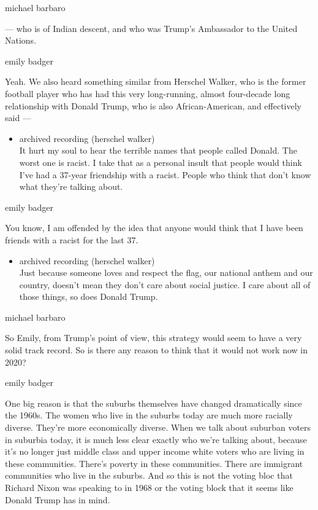 michael barbaro

--- who is of Indian descent, and who was Trump's Ambassador to the
United Nations.

emily badger

Yeah. We also heard something similar from Herschel Walker, who is the
former football player who has had this very long-running, almost
four-decade long relationship with Donald Trump, who is also
African-American, and effectively said ---

\begin{itemize}
\tightlist
\item
  archived recording (herschel walker)\\
  It hurt my soul to hear the terrible names that people called Donald.
  The worst one is racist. I take that as a personal insult that people
  would think I've had a 37-year friendship with a racist. People who
  think that don't know what they're talking about.
\end{itemize}

emily badger

You know, I am offended by the idea that anyone would think that I have
been friends with a racist for the last 37.

\begin{itemize}
\tightlist
\item
  archived recording (herschel walker)\\
  Just because someone loves and respect the flag, our national anthem
  and our country, doesn't mean they don't care about social justice. I
  care about all of those things, so does Donald Trump.
\end{itemize}

michael barbaro

So Emily, from Trump's point of view, this strategy would seem to have a
very solid track record. So is there any reason to think that it would
not work now in 2020?

emily badger

One big reason is that the suburbs themselves have changed dramatically
since the 1960s. The women who live in the suburbs today are much more
racially diverse. They're more economically diverse. When we talk about
suburban voters in suburbia today, it is much less clear exactly who
we're talking about, because it's no longer just middle class and upper
income white voters who are living in these communities. There's poverty
in these communities. There are immigrant communities who live in the
suburbs. And so this is not the voting bloc that Richard Nixon was
speaking to in 1968 or the voting block that it seems like Donald Trump
has in mind.

